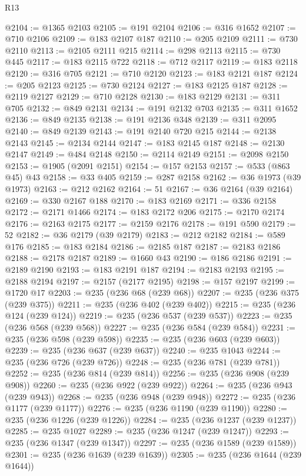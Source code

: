 \begin{lexlean}{R13}
\begin{coremodule}
@2104 := @1365 @2103
@2105 := @191 @2104
@2106 := @316 @1652
@2107 := @710 @2106
@2109 := @183 @2107 @187
@2110 := @205 @2109
@2111 := @730 @2110
@2113 := @2105 @2111 @215
@2114 := @298 @2113
@2115 := @730 @445
@2117 := @183 @2115 @722
@2118 := @712 @2117
@2119 := @183 @2118
@2120 := @316 @705
@2121 := @710 @2120
@2123 := @183 @2121 @187
@2124 := @205 @2123
@2125 := @730 @2124
@2127 := @183 @2125 @187
@2128 := @2119 @2127
@2129 := @710 @2128
@2130 := @183 @2129
@2131 := @311 @705
@2132 := @849 @2131
@2134 := @191 @2132 @703
@2135 := @311 @1652
@2136 := @849 @2135
@2138 := @191 @2136 @348
@2139 := @311 @2095
@2140 := @849 @2139
@2143 := @191 @2140 @720 @215
@2144 := @2138 @2143
@2145 := @2134 @2144
@2147 := @183 @2145 @187
@2148 := @2130 @2147
@2149 := @484 @2148
@2150 := @2114 @2149
@2151 := @2098 @2150
@2153 := @1905 (@2091 @2151)
@2154 := @157 @2153
@2157 := @533 (@863 @45) @43
@2158 := @33 @405
@2159 := @287 @2158
@2162 := @36 @1973 (@39 @1973)
@2163 := @212 @2162
@2164 := 51
@2167 := @36 @2164 (@39 @2164)
@2169 := @330 @2167 @188
@2170 := @183 @2169
@2171 := @336 @2158
@2172 := @2171 @1466
@2174 := @183 @2172 @206
@2175 := @2170 @2174
@2176 := @2163 @2175
@2177 := @2159 @2176
@2178 := @191 @590
@2179 := 52
@2182 := @36 @2179 (@39 @2179)
@2183 := @212 @2182
@2184 := @589 @176
@2185 := @183 @2184
@2186 := @2185 @187
@2187 := @2183 @2186
@2188 := @2178 @2187
@2189 := @1660 @43
@2190 := @186 @2186
@2191 := @2189 @2190
@2193 := @183 @2191 @187
@2194 := @2183 @2193
@2195 := @2188 @2194
@2197 := @2157 (@2177 @2195)
@2198 := @157 @2197
@2199 := @1720 @17
@2203 := @235 (@236 @68 (@239 @68))
@2207 := @235 (@236 @375 (@239 @375))
@2211 := @235 (@236 @402 (@239 @402))
@2215 := @235 (@236 @124 (@239 @124))
@2219 := @235 (@236 @537 (@239 @537))
@2223 := @235 (@236 @568 (@239 @568))
@2227 := @235 (@236 @584 (@239 @584))
@2231 := @235 (@236 @598 (@239 @598))
@2235 := @235 (@236 @603 (@239 @603))
@2239 := @235 (@236 @637 (@239 @637))
@2240 := @235 @1043
@2244 := @235 (@236 @726 (@239 @726))
@2248 := @235 (@236 @781 (@239 @781))
@2252 := @235 (@236 @814 (@239 @814))
@2256 := @235 (@236 @908 (@239 @908))
@2260 := @235 (@236 @922 (@239 @922))
@2264 := @235 (@236 @943 (@239 @943))
@2268 := @235 (@236 @948 (@239 @948))
@2272 := @235 (@236 @1177 (@239 @1177))
@2276 := @235 (@236 @1190 (@239 @1190))
@2280 := @235 (@236 @1226 (@239 @1226))
@2284 := @235 (@236 @1237 (@239 @1237))
@2285 := @235 @1027
@2289 := @235 (@236 @1247 (@239 @1247))
@2293 := @235 (@236 @1347 (@239 @1347))
@2297 := @235 (@236 @1589 (@239 @1589))
@2301 := @235 (@236 @1639 (@239 @1639))
@2305 := @235 (@236 @1644 (@239 @1644))

\end{coremodule}
\end{lexlean}
